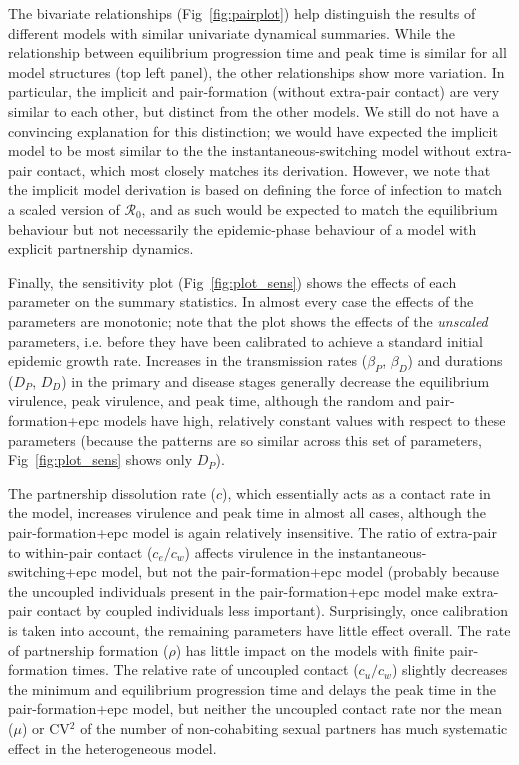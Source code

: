 \documentclass[10pt,letterpaper]{article}
\renewcommand{\figurename}{Fig}
\newcommand{\rzero}{{\mathcal R}_0}
\begin{document}
The bivariate relationships (\figurename~\ref{fig:pairplot}) help distinguish the results of 
different models with similar univariate dynamical summaries. While the
relationship between equilibrium progression time and peak time is
similar for all model structures (top left panel), the other
relationships show more variation. In particular, the implicit
and pair-formation (without extra-pair contact) are very similar
to each other, but distinct from the other models. We still do
not have a convincing explanation for this distinction; we
would have expected the implicit model to be most similar to the
the instantaneous-switching model without extra-pair contact,
which most closely matches its derivation. However, we note
that the implicit model derivation is based on defining
the force of infection to match a scaled version of $\rzero$,
and as such would be expected to match the equilibrium behaviour
but not necessarily the epidemic-phase behaviour of a model
with explicit partnership dynamics.

Finally, the sensitivity plot (\figurename~\ref{fig:plot_sens}) shows the effects 
of each parameter on the summary statistics. In almost every case the
effects of the parameters are monotonic; note that
the plot shows the effects of the \emph{unscaled} parameters, i.e.
before they have been calibrated to achieve a standard initial epidemic
growth rate.
Increases in the transmission rates ($\beta_P$, $\beta_D$)
and durations ($D_P$, $D_D$) in the primary and disease stages generally
decrease the equilibrium virulence, peak virulence, and peak time,
although the random and pair-formation+epc 
models have high, relatively
constant values with respect to these parameters
(because the patterns are so similar across this set of parameters,
\figurename~\ref{fig:plot_sens} shows only $D_P$).

The partnership dissolution rate ($c$), which essentially
acts as a contact rate in the model,
increases virulence and peak time in almost all
cases, although the pair-formation+epc
model is again relatively insensitive.
The ratio of extra-pair to within-pair contact ($c_e/c_w$) affects
virulence in the instantaneous-switching+epc model, but not the pair-formation+epc
model (probably because the uncoupled individuals present in the pair-formation+epc
model make extra-pair contact by coupled individuals less important).
Surprisingly, once calibration
is taken into account, the remaining parameters have little effect overall.
The rate of partnership formation ($\rho$) 
has little impact on the models with finite pair-formation times.
The relative rate of uncoupled contact ($c_u/c_w$) slightly decreases the
minimum and equilibrium progression time and delays the peak time in the
pair-formation+epc model, but neither the uncoupled contact rate nor
the mean ($\mu$) or CV$^2$ of the number of non-cohabiting sexual
partners has much systematic effect in the heterogeneous model.
\end{document}
